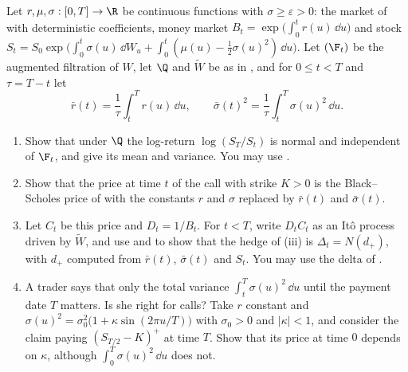 \begin{exercise}\label{ex:rn-deterministic}
\medium Let $r,\mu,\sigma:[0,T]\to\R$ be continuous functions with $\sigma\ge\varepsilon>0$:
the market of  with deterministic coefficients, money market
$B_t=\exp\big(\int_0^tr(u)\,\dd u\big)$ and stock
$S_t=S_0\exp\big(\int_0^t\sigma(u)\,\dd W_u+\int_0^t(\mu(u)-\frac12\sigma(u)^2)\,\dd u\big)$.
Let $(\F_t)$ be the augmented filtration of $W$, let $\Q$ and $\widetilde W$ be as in
, and for $0\le t<T$ and $\tau=T-t$ let
\[
  \bar r(t)=\frac1\tau\int_t^Tr(u)\,\dd u,\qquad\bar\sigma(t)^2=\frac1\tau\int_t^T\sigma(u)^2\,\dd u .
\]
\begin{enumerate}[label=(\alph*)]
  \item Show that under $\Q$ the log-return $\log(S_T/S_t)$ is normal and independent of
    $\F_t$, and give its mean and variance. You may use .
  \item Show that the price at time $t$ of the call with strike $K>0$ is the Black--Scholes
    price of  with the constants $r$ and $\sigma$ replaced by $\bar
    r(t)$ and $\bar\sigma(t)$.
  \item Let $C_t$ be this price and $D_t=1/B_t$. For $t<T$, write $D_tC_t$ as an It\^o process
    driven by $\widetilde W$, and use  and
     to show that the hedge of (iii) is
    $\Delta_t=N(d_+)$, with $d_+$ computed from $\bar r(t)$, $\bar\sigma(t)$ and $S_t$. You may
    use the delta of .
  \item A trader says that only the total variance $\int_t^T\sigma(u)^2\,\dd u$ until the
    payment date $T$ matters. Is she right for calls? Take $r$ constant and
    $\sigma(u)^2=\sigma_0^2\big(1+\kappa\sin(2\pi u/T)\big)$ with $\sigma_0>0$ and
    $|\kappa|<1$, and consider the claim paying $(S_{T/2}-K)^+$ at time $T$. Show that its
    price at time $0$ depends on $\kappa$, although $\int_0^T\sigma(u)^2\,\dd u$ does not.
\end{enumerate}
\end{exercise}

